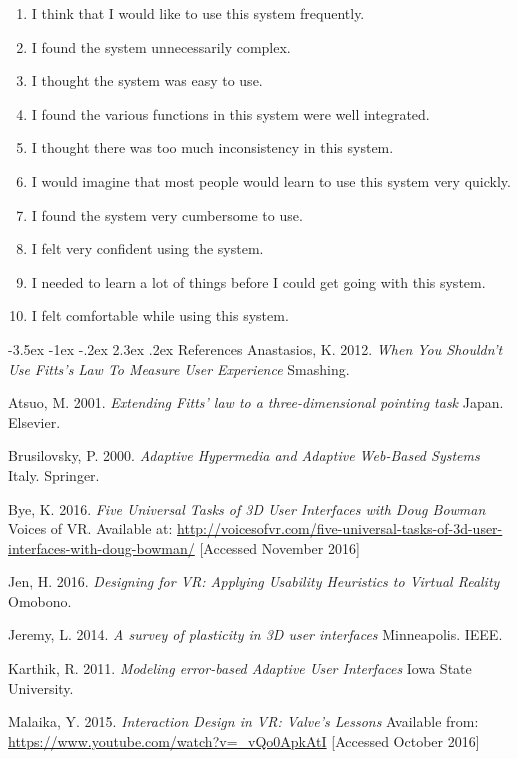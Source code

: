 \documentclass[12pt]{article}
\makeatletter
\renewcommand{\section}{\@startsection {section}{1}{\z@}%
             {-3.5ex \@plus -1ex \@minus -.2ex}%
             {2.3ex \@plus .2ex}%
             {\normalfont\Large\scshape\bfseries}}
\makeatother
\begin{document}
\begin{enumerate}
\item I think that I would like to use this system frequently.
\item I found the system unnecessarily complex. 
\item I thought the system was easy to use. 
\item I found the various functions in this system were well integrated. 
\item I thought there was too much inconsistency in this system. 
\item I would imagine that most people would learn to use this system very quickly. 
\item I found the system very cumbersome to use. 
\item I felt very confident using the system.
\item I needed to learn a lot of things before I could get going with this system. 
\item I felt comfortable while using this system.
\end{enumerate}


\pagebreak

\section{References}
Anastasios, K. 2012. \emph{When You Shouldn't Use Fitts's Law To Measure User Experience} Smashing. 

Atsuo, M. 2001. \emph{Extending Fitts' law to a three-dimensional pointing task} Japan. Elsevier. 

Brusilovsky, P. 2000. \emph{Adaptive Hypermedia and Adaptive Web-Based Systems} Italy. Springer.

Bye, K. 2016. \emph{Five Universal Tasks of 3D User Interfaces with Doug Bowman} Voices of VR. Available at: \url{http://voicesofvr.com/five-universal-tasks-of-3d-user-interfaces-with-doug-bowman/} [Accessed November 2016]

Jen, H. 2016. \emph{Designing for VR: Applying Usability Heuristics to Virtual Reality} Omobono. 

Jeremy, L. 2014. \emph{A survey of plasticity in 3D user interfaces} Minneapolis. IEEE. 

Karthik, R. 2011. \emph{Modeling error-based Adaptive User Interfaces} Iowa State University. 

Malaika, Y. 2015. \emph{Interaction Design in VR: Valve's Lessons } Available from: \url{https://www.youtube.com/watch?v=_vQo0ApkAtI} [Accessed October 2016]
\end{document}
